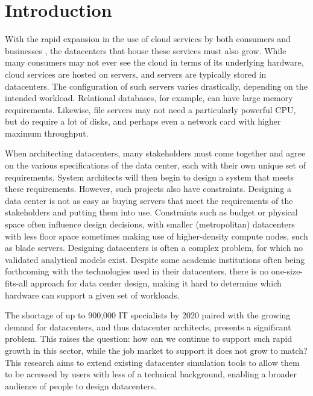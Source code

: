 \documentclass[11pt]{article}
\begin{document}
\section{Introduction} \label{sec:introduction}
	With the rapid expansion in the use of cloud services by both consumers and businesses \cite{Kushida2015}\cite{mokhtar2013}, the datacenters that house these services must also grow. 
	While many consumers may not ever see the cloud in terms of its underlying hardware, cloud services are hosted on servers, and servers are typically stored in datacenters. 
	The configuration of such servers varies drastically, depending on the intended workload. 
	Relational databases, for example, can have large memory requirements\cite{Kabakus2017}. 
	Likewise, file servers may not need a particularly powerful CPU, but do require a lot of disks, and perhaps even a network card with higher maximum throughput\cite{Drapeau1994}.

	When architecting datacenters, many stakeholders must come together and agree on the various specifications of the data center, each with their own unique set of requirements. 
	System architects will then begin to design a system that meets these requirements. 
	However, such projects also have constraints. 
	Designing a data center is not as easy as buying servers that meet the requirements of the stakeholders and putting them into use. 
	Constraints such as budget or physical space often influence design decisions, with smaller (metropolitan) datacenters with less floor space sometimes making use of higher-density compute nodes, such as blade servers. 
	Designing datacenters is often a complex problem, for which no validated analytical models exist. 
	Despite some academic institutions often being forthcoming with the technologies used in their datacenters\cite{SURF2020}, there is no one-size-fits-all approach for data center design, making it hard to determine which hardware can support a given set of workloads.

	The shortage of up to 900,000 IT specialists by 2020\cite{Gareis2014} paired with the growing demand for datacenters, and thus datacenter architects, presents a significant problem.
	This raises the question: how can we continue to support such rapid growth in this sector, while the job market to support it does not grow to match?
	This research aims to extend existing datacenter simulation tools to allow them to be accessed by users with less of a technical background, enabling a broader audience of people to design datacenters.
\end{document}
